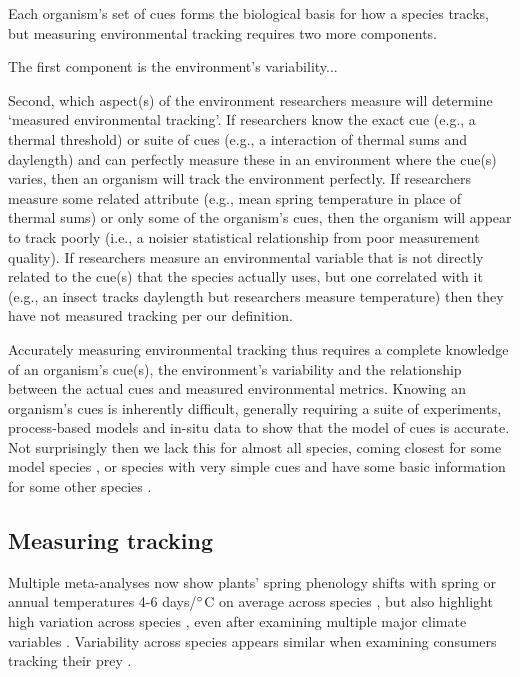 \documentclass[11pt,letterpaper]{article}
\begin{document}
Each organism's set of cues forms the biological basis for how a species tracks, but measuring environmental tracking requires two more components.

The first component is the environment's variability...

Second, which aspect(s) of the environment researchers measure will determine `measured environmental tracking'. If researchers know the exact cue (e.g., a thermal threshold) or suite of cues (e.g., a interaction of thermal sums and daylength) and can perfectly measure these in an environment where the cue(s) varies, then an organism will track the environment perfectly. If researchers measure some related attribute (e.g., mean spring temperature in place of thermal sums) or only some of the organism's cues, then the organism will appear to track poorly (i.e., a noisier statistical relationship from poor measurement quality).  If researchers measure an environmental variable that is not directly related to the cue(s) that the species actually uses, but one correlated with it (e.g., an insect tracks daylength but researchers measure temperature) then they have not measured tracking per our definition.

Accurately measuring environmental tracking thus requires a complete knowledge of an organism's cue(s), the environment's variability and the relationship between the actual cues and measured environmental metrics. Knowing an organism's cues is inherently difficult, generally requiring a suite of experiments, process-based models and in-situ data to show that the model of cues is accurate. Not surprisingly then we lack this for almost all species, coming closest for some model species \citep[e.g., \emph{Arabidopsis thaliana},][]{Kingsolver2007,Wilczek:2009oa}, or species with very simple cues \citep[e.g., coral \emph{Acropora millepora},][]{levy2007} and have some basic information for some other species \citep[e.g., the Great Tit, \emph{Parus major},][]{charm2008}. 

\subsection{Measuring tracking}
Multiple meta-analyses now show plants' spring phenology shifts with spring or annual temperatures 4-6 days/$\degree$C on average across species \citep{Richardson:2006qh,Wolkovich:2012n,thackeray2016}, but also highlight high variation across species  \citep{Cook:2012pnas}, even after examining multiple major climate variables \citep{thackeray2016}. Variability across species appears similar when examining consumers tracking their prey \citep[across diverse species tracking over time is 6.1 days/decade but ranges from zero to 15 days/decade, see][]{kharouba2018}. 
\end{document}
